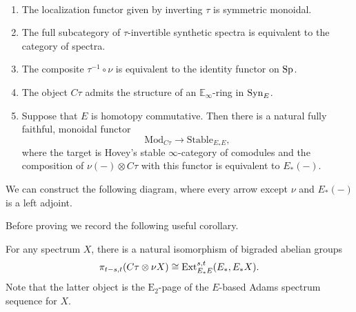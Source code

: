 \begin{thm} \label{thm:tau-inv}\ 

  \begin{enumerate}
  \item The localization functor given by inverting $\tau$ is symmetric monoidal. 
  \item The full subcategory of $\tau$-invertible synthetic spectra is equivalent to the category of spectra.
  \item The composite $\tau^{-1} \circ \nu$ is equivalent to the identity functor on $\operatorname{\mathrm{Sp}}$.
  \item The object $C\tau$ admits the structure of an $\mathbb{E}_\infty$-ring in $\mathrm{Syn}_E$.
  \item Suppose that $E$ is homotopy commutative.
    Then there is a natural fully faithful, monoidal functor
    $$ \mathrm{Mod}_{C\tau} \to \mathrm{Stable}_{E_*E},$$
    where the target is Hovey's stable $\infty$-category of comodules and
    the composition of $\nu(-) \otimes C\tau$ with this functor is equivalent to $E_*(-)$.
  \end{enumerate}
  We can construct the following diagram, where every arrow except $\nu$ and $E_*(-)$ is a left adjoint.
  \begin{center}
  \end{center}
\end{thm}

Before proving  we record the following useful corollary.

\begin{cor} \label{lemm:ctauE2}
  For any spectrum $X$, there is a natural isomorphism of bigraded abelian groups
  $$ \pi_{t-s,t}(C\tau \otimes \nu X) \cong \operatorname{\mathrm{Ext}}_{E_*E}^{s,t}(E_*,E_*X).$$
  Note that the latter object is the $\mathrm{E}_2$-page of the $E$-based Adams spectrum sequence for $X$.
\end{cor}

